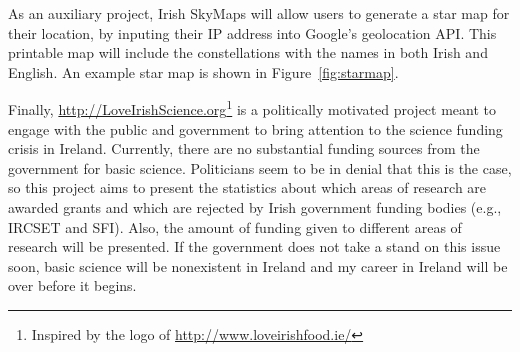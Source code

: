 As an auxiliary project, Irish SkyMaps will allow users to generate a star map for their location, by inputing their IP address into Google's geolocation API. This printable map will include the constellations with the names in both Irish and English. An example star map is shown in Figure~\ref{fig:starmap}.

Finally, \url{http://LoveIrishScience.org}\footnote{Inspired by the logo of \url{http://www.loveirishfood.ie/}} is a politically motivated project meant to engage with the public and government to bring attention to the science funding crisis in Ireland. Currently, there are no substantial funding sources from the government for basic science. Politicians seem to be in denial that this is the case, so this project aims to present the statistics about which areas of research are awarded grants and which are rejected by Irish government funding bodies (e.g., IRCSET and SFI). Also, the amount of funding given to different areas of research will be presented. If the government does not take a stand on this issue soon, basic science will be nonexistent in Ireland and my career in Ireland will be over before it begins.

